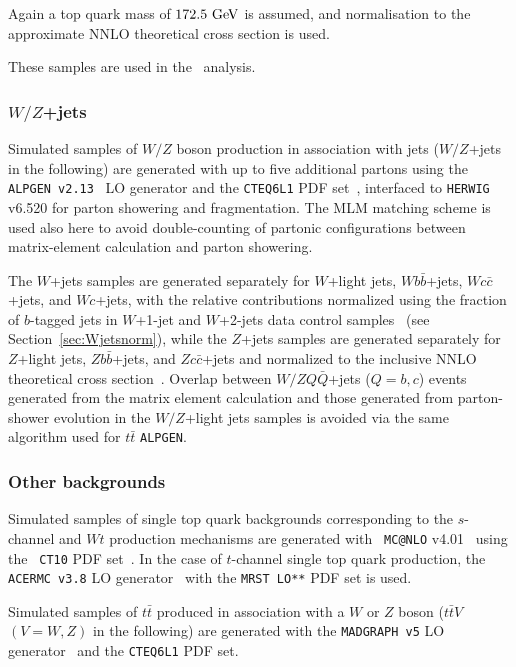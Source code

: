 
Again a top quark mass of $172.5\gev$ is assumed, and normalisation to the
approximate NNLO theoretical cross section is used.

These samples are used in the \htx\ analysis.


\subsubsection{$W/Z$+jets}

Simulated samples of $W/Z$ boson production in association with jets
($W/Z$+jets in the following) are generated with up to five additional 
partons using the {\tt ALPGEN v2.13}~\cite{ALPGEN} LO generator and the 
{\tt CTEQ6L1} PDF set~\cite{cteq6}, interfaced to {\tt HERWIG} v6.520 
for parton showering and fragmentation.
The MLM matching scheme is used also here to avoid double-counting of partonic configurations 
between  matrix-element  calculation and parton showering.

The $W$+jets samples are generated separately for $W$+light jets, 
$Wb\bar{b}$+jets, $Wc\bar{c}$+jets, and $Wc$+jets, 
with the relative contributions normalized using the fraction 
of $b$-tagged jets in $W$+1-jet and $W$+2-jets data 
control samples~\cite{whf} (see Section~\ref{sec:Wjetsnorm}), while
the $Z$+jets samples are generated separately 
for $Z$+light jets, $Zb\bar{b}$+jets, and $Zc\bar{c}$+jets and
normalized to the inclusive NNLO theoretical cross section~\cite{vjetsxs}.
Overlap between $W/ZQ\bar{Q}$+jets ($Q=b,c$) 
events generated from the matrix element calculation and those
generated from parton-shower evolution in the $W/Z$+light jets
samples is avoided via the same algorithm used
for $t\bar{t}$ \texttt{ALPGEN}.

\subsubsection{Other backgrounds}\label{subsec:otherbkg}
Simulated samples of single top quark backgrounds corresponding to the
$s$-channel and $Wt$ production mechanisms are generated with {\tt
MC@NLO} v4.01~\cite{mcatnlo_1,mcatnlo_2,mcatnlo_3} using the {\tt
CT10} PDF set~\cite{ct10}.  In the case of $t$-channel single top
quark production, the {\tt ACERMC v3.8} LO generator~\cite{acermc}
with the {\tt MRST LO**} PDF set is used.

Simulated samples of $t\bar{t}$ produced in association with a $W$ or $Z$ boson
($t\bar{t}V$ $(V=W,Z)$ in the following) are generated with the {\tt MADGRAPH v5} LO
generator~\cite{madgraph} and the {\tt CTEQ6L1} PDF set.  

